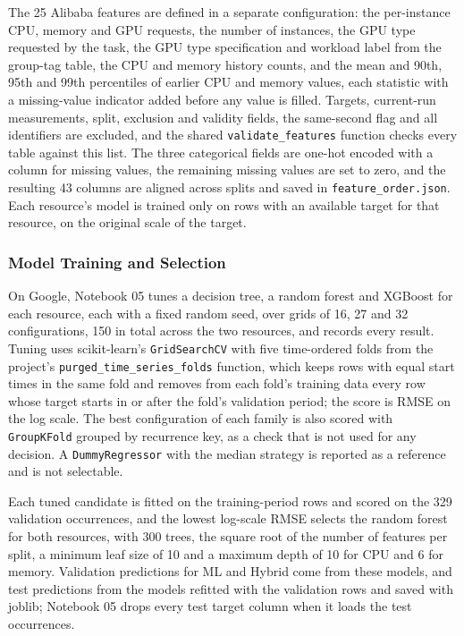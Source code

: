 The 25 Alibaba features are defined in a separate configuration: the per-instance CPU, memory and GPU requests, the number of instances, the GPU type requested by the task, the GPU type specification and workload label from the group-tag table, the CPU and memory history counts, and the mean and 90th, 95th and 99th percentiles of earlier CPU and memory values, each statistic with a missing-value indicator added before any value is filled. Targets, current-run measurements, split, exclusion and validity fields, the same-second flag and all identifiers are excluded, and the shared \texttt{validate\_features} function checks every table against this list. The three categorical fields are one-hot encoded with a column for missing values, the remaining missing values are set to zero, and the resulting 43 columns are aligned across splits and saved in \texttt{feature\_order.json}. Each resource's model is trained only on rows with an available target for that resource, on the original scale of the target.

\subsubsection{Model Training and Selection}\label{sec:5.3.2}

On Google, Notebook 05 tunes a decision tree, a random forest and XGBoost for each resource, each with a fixed random seed, over grids of 16, 27 and 32 configurations, 150 in total across the two resources, and records every result. Tuning uses scikit-learn's \texttt{GridSearchCV} with five time-ordered folds from the project's \texttt{purged\_time\_series\_folds} function, which keeps rows with equal start times in the same fold and removes from each fold's training data every row whose target starts in or after the fold's validation period; the score is RMSE on the log scale. The best configuration of each family is also scored with \texttt{GroupKFold} grouped by recurrence key, as a check that is not used for any decision. A \texttt{DummyRegressor} with the median strategy is reported as a reference and is not selectable.

Each tuned candidate is fitted on the training-period rows and scored on the 329 validation occurrences, and the lowest log-scale RMSE selects the random forest for both resources, with 300 trees, the square root of the number of features per split, a minimum leaf size of 10 and a maximum depth of 10 for CPU and 6 for memory. Validation predictions for ML and Hybrid come from these models, and test predictions from the models refitted with the validation rows and saved with joblib; Notebook 05 drops every test target column when it loads the test occurrences.


